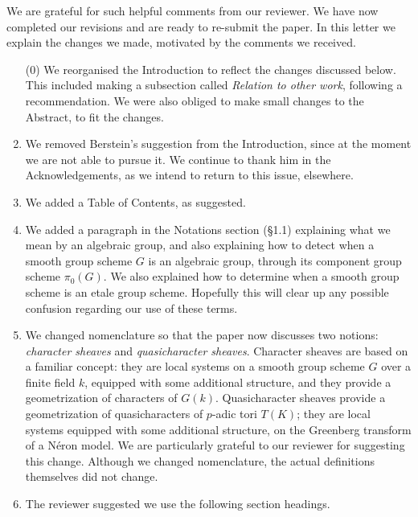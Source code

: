 \documentclass[a4, 10pt]{amsart}
\theoremstyle{definition}
\theoremstyle{remark}
\begin{document}
\rightline{\today}
\medskip

\medskip

We are grateful for such helpful comments from our reviewer. 
We have now completed our revisions and are ready to re-submit the paper. 
In this letter we explain the changes we made, motivated by the comments we received.

\begin{enumerate}
\item[(0)]
We reorganised the Introduction to reflect the changes discussed below. 
This included making a subsection called {\it Relation to other work}, following a recommendation.
We were also obliged to make small changes to the Abstract, to fit the changes.
\item
We removed Berstein's suggestion from the Introduction, since at the moment we are not able to pursue it. 
We continue to thank him in the Acknowledgements, as we intend to return to this issue, elsewhere.
\item
We added a Table of Contents, as suggested.
\item 
We added a paragraph in the Notations section (\S 1.1) explaining what we mean by an algebraic group, and also explaining how to detect when a smooth group scheme $G$ is an algebraic group, through its component group scheme $\pi_0(G)$.
We also explained how to determine when a smooth group scheme is an etale group scheme.
Hopefully this will clear up any possible confusion regarding our use of these terms.
\item
We changed nomenclature so that the paper now discusses two notions: {\it character sheaves} and {\it quasicharacter sheaves}. Character sheaves are based on a familiar concept: they are local systems on a smooth group scheme $G$ over a finite field $k$, equipped with some additional structure, and they provide a geometrization of characters of $G(k)$.  Quasicharacter sheaves provide a geometrization of quasicharacters of $p$-adic tori $T(K)$; they are local systems equipped with some additional structure, on the Greenberg transform of a N\'eron model. 
We are particularly grateful to our reviewer for suggesting this change.
Although we changed nomenclature, the actual definitions themselves did not change.
\item
The reviewer suggested we use the following section headings.
\begin{enumerate}

\end{enumerate}
\end{enumerate}
\end{document}

